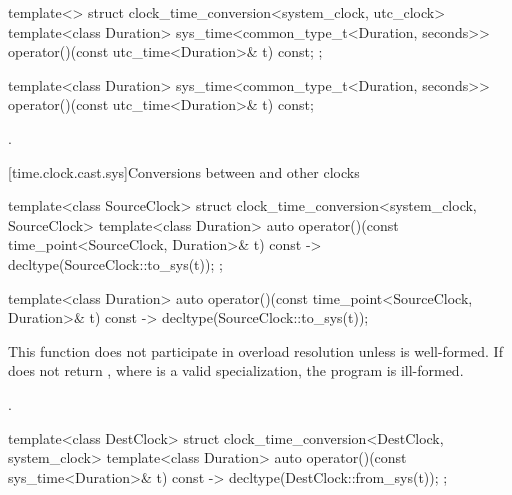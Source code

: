 \begin{codeblock}
template<>
struct clock_time_conversion<system_clock, utc_clock> {
  template<class Duration>
    sys_time<common_type_t<Duration, seconds>>
      operator()(const utc_time<Duration>& t) const;
};
\end{codeblock}

%
\begin{itemdecl}
template<class Duration>
  sys_time<common_type_t<Duration, seconds>>
    operator()(const utc_time<Duration>& t) const;
\end{itemdecl}

\begin{itemdescr}
\pnum
\returns
{}.
\end{itemdescr}

[time.clock.cast.sys]{Conversions between  and other clocks}

\begin{codeblock}
template<class SourceClock>
struct clock_time_conversion<system_clock, SourceClock> {
  template<class Duration>
    auto operator()(const time_point<SourceClock, Duration>& t) const
      -> decltype(SourceClock::to_sys(t));
};
\end{codeblock}

%
\begin{itemdecl}
template<class Duration>
  auto operator()(const time_point<SourceClock, Duration>& t) const
    -> decltype(SourceClock::to_sys(t));
\end{itemdecl}

\begin{itemdescr}
\pnum
\remarks
This function does not participate in overload resolution unless
 is well-formed.
If 
does not return ,
where  is a valid  specialization,
the program is ill-formed.

\pnum
\returns
{}.
\end{itemdescr}

\begin{codeblock}
template<class DestClock>
struct clock_time_conversion<DestClock, system_clock> {
  template<class Duration>
    auto operator()(const sys_time<Duration>& t) const
      -> decltype(DestClock::from_sys(t));
};
\end{codeblock}

